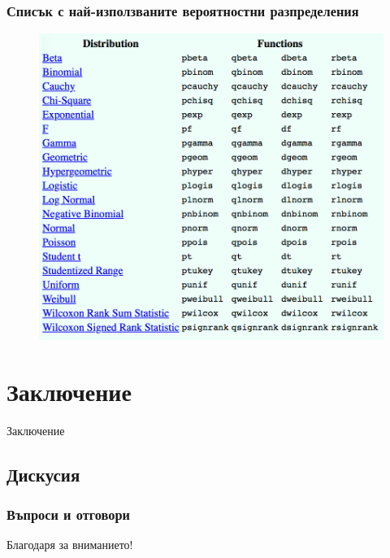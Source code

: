\documentclass{beamer}
\begin{document}
\begin{frame}
\frametitle{Списък с най-използваните вероятностни разпределения}
\begin{figure}[]\includegraphics[width=\textwidth,height=0.75\textheight]{pic0055}\end{figure}
\end{frame}

\section{Заключение}

\begin{frame}
\center \huge{Заключение}
\end{frame}

\subsection{Дискусия}

\begin{frame}
\frametitle{Въпроси и отговори}
\center \huge{Благодаря за вниманието!}
\end{frame}
\end{document}

